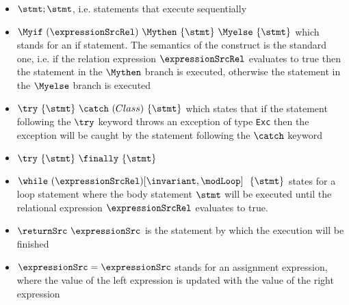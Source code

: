 \begin{itemize}
   \item $\stmt;\stmt$, i.e. statements that execute sequentially 

   \item $\Myif \ (\expressionSrcRel) \ \Mythen \ \{ \stmt \} \  \Myelse \ \{ \stmt \}  $ which stands for
         an if statement. The semantics of the construct is the standard one, i.e. if the relation expression $\expressionSrcRel$ 
	 evaluates to true then the statement in the $ \Mythen$ branch is executed, otherwise the statement in the
	 $ \Myelse$ branch is executed

   \item $ \try  \ \{ \stmt \}  \ \catch \ ( Class  )\ \{ \stmt \}  $ which states that if the
            statement following the $ \try $ keyword throws an exception of type \texttt{Exc} then
	    the exception will be caught by the statement following the  $ \catch $ keyword
	        
   \item  $ \try  \ \{ \stmt \} \ \finally \ \{ \stmt \} $ 
   \item $ \while \ (\expressionSrcRel) \lbrack \invariant, \modLoop \rbrack \ \do \ \{ \stmt \} $ states for a loop statement where the body statement
         $ \stmt$ will be executed until the relational expression  $\expressionSrcRel$ evaluates to true.
   \item  $ \returnSrc \  \expressionSrc $ is the statement by which the execution will be finished
   \item $ \expressionSrc = \expressionSrc$ stands for an assignment expression, where the value of the left expression is updated with the value   
         of the right expression  
 
\end{itemize}
